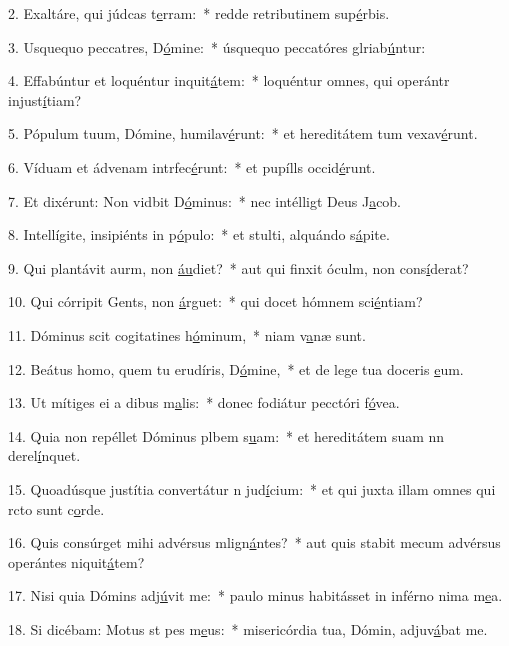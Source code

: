 2. Exaltáre, qui júdcas t\uline{e}rram:~* redde retributinem sup\uline{é}rbis.\par 
3. Usquequo peccatres, D\uline{ó}mine:~* úsquequo peccatóres glriab\uline{ú}ntur:\par 
4. Effabúntur et loquéntur inquit\uline{á}tem:~* loquéntur omnes, qui operántr injust\uline{í}tiam?\par 
5. Pópulum tuum, Dómine, humilav\uline{é}runt:~* et hereditátem tum vexav\uline{é}runt.\par 
6. Víduam et ádvenam intrfec\uline{é}runt:~* et pupílls occid\uline{é}runt.\par 
7. Et dixérunt: Non vidbit D\uline{ó}minus:~* nec intélligt Deus J\uline{a}cob.\par 
8. Intellígite, insipiénts in p\uline{ó}pulo:~* et stulti, alquándo s\uline{á}pite.\par 
9. Qui plantávit aurm, non \uline{áu}diet?~* aut qui finxit óculm, non cons\uline{í}derat?\par 
10. Qui córripit Gents, non \uline{á}rguet:~* qui docet hómnem sci\uline{é}ntiam?\par 
11. Dóminus scit cogitatines h\uline{ó}minum,~* niam v\uline{a}næ sunt.\par 
12. Beátus homo, quem tu erudíris, D\uline{ó}mine,~* et de lege tua doceris \uline{e}um.\par 
13. Ut mítiges ei a dibus m\uline{a}lis:~* donec fodiátur pecctóri f\uline{ó}vea.\par 
14. Quia non repéllet Dóminus plbem s\uline{u}am:~* et hereditátem suam nn derel\uline{í}nquet.\par 
15. Quoadúsque justítia convertátur n jud\uline{í}cium:~* et qui juxta illam omnes qui rcto sunt c\uline{o}rde.\par 
16. Quis consúrget mihi advérsus mlign\uline{á}ntes?~* aut quis stabit mecum advérsus operántes niquit\uline{á}tem?\par 
17. Nisi quia Dómins adj\uline{ú}vit me:~* paulo minus habitásset in inférno nima m\uline{e}a.\par 
18. Si dicébam: Motus st pes m\uline{e}us:~* misericórdia tua, Dómin, adjuv\uline{á}bat me.\par 
